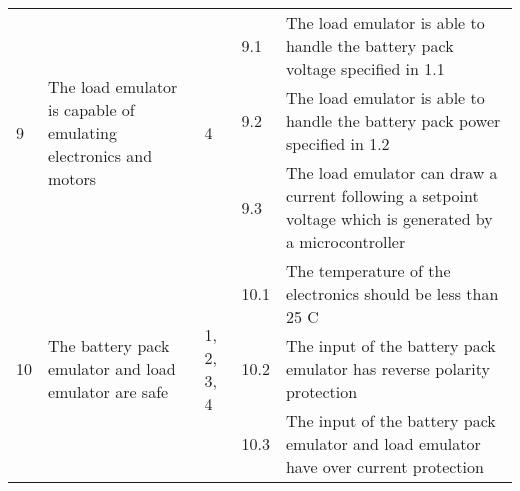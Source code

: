 \begin{longtable}{|l|p{2in}|p{0.8in}|l|p{2in}|}
    \multirow{3}{*}{9}  & \multirow{3}{*}{The load emulator is capable of emulating electronics and motors}                                                     & \multirow{3}{*}{4}          & 9.1  & The load emulator is able to handle the battery pack voltage specified in 1.1                             \\ \cline{4-5} 
                        &                                                                                                                                       &                             & 9.2  & The load emulator is able to handle the battery pack power specified in 1.2                               \\ \cline{4-5} 
                        &                                                                                                                                       &                             & 9.3  & The load emulator can draw a current following a setpoint voltage which is generated by a microcontroller \\ \hline
    \multirow{3}{*}{10} & \multirow{3}{*}{The battery pack emulator and load emulator are safe}                                                                 & \multirow{3}{*}{1, 2, 3, 4} & 10.1 & The temperature of the electronics should be less than 25 C                                               \\ \cline{4-5} 
                        &                                                                                                                                       &                             & 10.2 & The input of the battery pack emulator has reverse polarity protection                                    \\ \cline{4-5} 
                        &                                                                                                                                       &                             & 10.3 & The input of the battery pack emulator and load emulator have over current protection                     \\ \hline
\end{longtable}

